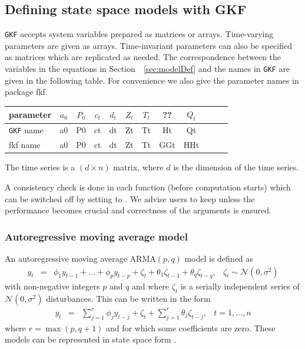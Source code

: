 \documentclass{article}
\newcommand{\GKF}{\texttt{GKF}\xspace}
\begin{document}
\subsection{Defining state space models with GKF}

\GKF accepts system variables prepared as matrices or arrays. Time-varying parameters are
given as arrays. Time-invariant parameters can also be specified as matrices which are
replicated as needed.
The correspondence between the variables in the equations in  Section~~\ref{sec:modelDef} and
the names in \GKF are given in the following table. For convenience we also give the
parameter names in package fkf.
\begin{center}
\begin{tabular}{l|ccccccccccc}
  parameter & $a_{0}$ & $P_{0}$ & $c_{t}$ & $d_{t}$ & $Z_{t}$ & $T_{t}$ & ?? & $Q_{t}$
  \\ \hline{}
  \GKF name & a0     & P0      & ct     & dt     & Zt     & Tt     & Ht & Qt
  \\
  fkf name  & a0     & P0      & ct     & dt     & Zt     & Tt     & GGt & HHt
\end{tabular}
\end{center}
The time series is a $(d\times n)$ matrix, where $d$ is the dimension of the time series.

A consistency check is done in each function (before computation starts) which can be
switched off by setting \verb@checkInputs@ to \verb@FALSE@. We advise users to keep
\verb@checkInputs@ \verb@TRUE@ unless the performance becomes crucial and correctness of the
arguments is ensured.


\subsubsection{Autoregressive moving average model}
An autoregressive moving average $\text{ARMA}(p, q)$ model is defined as
\begin{equation}
  \begin{array}{rccl}
    y_t & = & \phi_1 y_{t-1} + \dots + \phi_p y_{t-p} + \zeta_t + \theta_1 \zeta_{t-1} + \theta_q \zeta_{t-q}, & \zeta_t \sim \mathcal{N}(0,\sigma^2)
  \end{array}
  \label{eq:Armapq1}
\end{equation}
 with non-negative integers $p$ and $q$ and where $\zeta_t$ is a serially independent series of $ \mathcal{N}(0,\sigma^2)$ disturbances. This can be written in the form
\begin{equation}
  \begin{array}{rccl}
    y_t & = & \displaystyle \sum_{j=1}^r \phi_j y_{t-j} + \zeta_t + \sum_{j=1}^r \theta_j \zeta_{t-j}, & t=1,\dots,n
  \end{array}
  \label{eq:Armapq2}
\end{equation}
where $r = \max(p, q+1)$ and for which some coefficients are zero. These models can be
represented in state space form \citep[see][chap. 3.4]{durbin2012time}.
\end{document}
